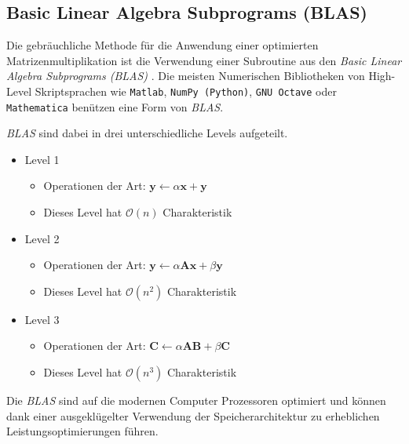 \subsection{Basic Linear Algebra Subprograms (BLAS)}

Die gebräuchliche Methode f\"ur die Anwendung einer optimierten Matrizenmultiplikation ist die Verwendung einer Subroutine aus den \textit{Basic Linear Algebra Subprograms (BLAS)}  \cite{multiplikation:BLAS}.
Die meisten Numerischen Bibliotheken von High-Level Skriptsprachen wie \texttt{Matlab}, \texttt{NumPy (Python)}, \texttt{GNU Octave} oder \texttt{Mathematica} ben\"utzen eine Form von \textit{BLAS}.

\textit{BLAS} sind dabei in drei unterschiedliche Levels aufgeteilt.

\begin{itemize}
	\item Level 1
	\begin{itemize}
		\item Operationen der Art: $\mathbf{y} \leftarrow \alpha \mathbf{x}+\mathbf{y}$
		\item Dieses Level hat $\mathcal{O}(n)$ Charakteristik
	\end{itemize}
	\item Level 2
	\begin{itemize}
		\item Operationen der Art: $\mathbf{y} \leftarrow \alpha \mathbf{A}\mathbf{x}+\beta  \mathbf{y}$
		\item Dieses Level hat $\mathcal{O}(n^2)$ Charakteristik
		\end{itemize}
		\item Level 3
		\begin{itemize}
			\item Operationen der Art: $\mathbf{C} \leftarrow \alpha \mathbf{A}\mathbf{B}+\beta\mathbf{C}$
			\item Dieses Level hat $\mathcal{O}(n^3)$ Charakteristik
			\end{itemize}
\end{itemize}

Die \textit{BLAS} sind auf die modernen Computer Prozessoren optimiert und k\"onnen dank einer ausgeklügelter Verwendung der Speicherarchitektur zu erheblichen Leistungsoptimierungen f\"uhren.


%
%

